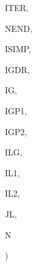 {\begin{DoxyParamCaption}
\item[{integer, dimension  (ilg)}]{I\+T\+E\+R, }
\item[{integer, dimension  (ilg)}]{N\+E\+N\+D, }
\item[{integer, dimension (ilg)}]{I\+S\+I\+M\+P, }
\item[{integer, dimension  (ilg)}]{I\+G\+D\+R, }
\item[{integer}]{I\+G, }
\item[{integer}]{I\+G\+P1, }
\item[{integer}]{I\+G\+P2, }
\item[{integer}]{I\+L\+G, }
\item[{integer}]{I\+L1, }
\item[{integer}]{I\+L2, }
\item[{integer}]{J\+L, }
\item[{integer}]{N}
\end{DoxyParamCaption}
)}\label{GRINFL_8f_aac6f2d3fad2a7b2c287fb2b821ba61f4}

